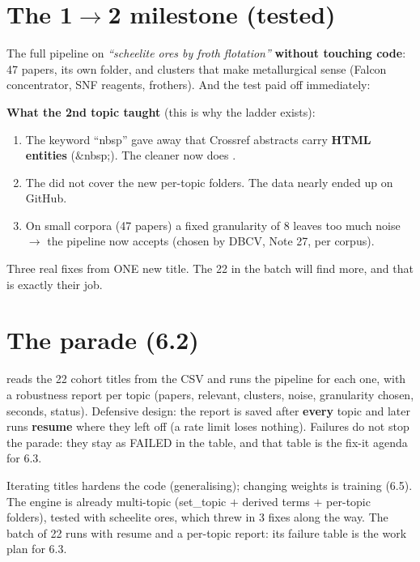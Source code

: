 \documentclass[11pt,a4paper]{article}
\begin{document}
\section{The 1\texorpdfstring{$\rightarrow$}{->}2 milestone (tested)}

The full pipeline on \emph{``scheelite ores by froth flotation''} \textbf{without touching
code}: 47 papers, its own folder, and clusters that make metallurgical sense (Falcon
concentrator, SNF reagents, frothers). And the test paid off immediately:

\begin{ojo}
\textbf{What the 2nd topic taught} (this is why the ladder exists):
\begin{enumerate}
  \item The keyword ``nbsp'' gave away that Crossref abstracts carry \textbf{HTML entities}
        ($\&$nbsp;). The cleaner now does .
  \item The  did not cover the new per-topic folders. The data nearly ended
        up on GitHub.
  \item On small corpora (47 papers) a fixed granularity of 8 leaves too much noise
        $\rightarrow$ the pipeline now accepts  (chosen by
        DBCV, Note 27, per corpus).
\end{enumerate}
Three real fixes from ONE new title. The 22 in the batch will find more, and that is exactly
their job.
\end{ojo}

\section{The parade (6.2)}

 reads the 22 cohort titles from the CSV and runs the pipeline for each
one, with a robustness report per topic (papers, relevant, clusters, noise, granularity chosen,
seconds, status). Defensive design: the report is saved after \textbf{every} topic and later
runs \textbf{resume} where they left off (a rate limit loses nothing). Failures do not stop the
parade: they stay as FAILED in the table, and that table is the fix-it agenda for 6.3.

\begin{resumen}
Iterating titles hardens the code (generalising); changing weights is training (6.5). The
engine is already multi-topic (set\_topic $+$ derived terms $+$ per-topic folders), tested with
scheelite ores, which threw in 3 fixes along the way. The batch of 22 runs with resume and a
per-topic report: its failure table is the work plan for 6.3.
\end{resumen}
\end{document}
